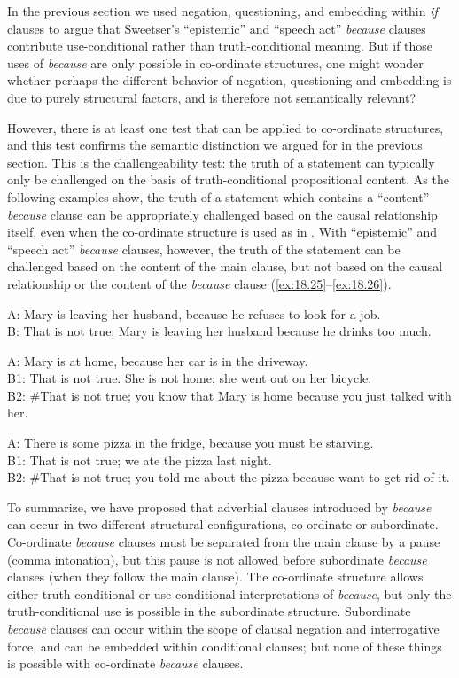 In the previous section we used negation, questioning, and embedding within \textit{if} clauses to argue that Sweetser’s “epistemic” and “speech act” \textit{because} clauses contribute use-conditional rather than truth-conditional meaning. But if those uses of \textit{because} are only possible in co-ordinate structures, one might wonder whether perhaps the different behavior of negation, questioning and embedding is due to purely structural factors, and is therefore not semantically relevant?



However, there is at least one test that can be applied to co-ordinate structures, and this test confirms the semantic distinction we argued for in the previous section. This is the challengeability test: the truth of a statement can typically only be challenged on the basis of truth-conditional propositional content. As the following examples show, the truth of a statement which contains a “content” \textit{because} clause can be appropriately challenged based on the causal relationship itself, even when the co-ordinate structure is used as in . With “epistemic” and “speech act” \textit{because} clauses, however, the truth of the statement can be challenged based on the content of the main clause, but not based on the causal relationship or the content of the \textit{because} clause (\ref{ex:18.25}--\ref{ex:18.26}).


\ea \label{ex:18.24}
A: Mary is leaving her husband, because he refuses to look for a job.\\
B: That is not true; Mary is leaving her husband because he drinks too much.
\z

\ea \label{ex:18.25}
A: Mary is at home, because her car is in the driveway.\\
B1: That is not true. She is not home; she went out on her bicycle.\\
B2: \#That is not true; you know that Mary is home because you just talked with her.
\z

\ea \label{ex:18.26}
A: There is some pizza in the fridge, because you must be starving.\\
B1: That is not true; we ate the pizza last night.\\
B2: \#That is not true; you told me about the pizza because want to get rid of it.
\z


To summarize, we have proposed that adverbial clauses introduced by \textit{because} can occur in two different structural configurations, co-ordinate or subordinate. Co-ordinate \textit{because} clauses must be separated from the main clause by a pause (comma intonation), but this pause is not allowed before subordinate \textit{because} clauses (when they follow the main clause). The co-ordinate structure allows either truth-conditional or use-conditional interpretations of \textit{because}, but only the truth-conditional use is possible in the subordinate structure. Subordinate \textit{because} clauses can occur within the scope of clausal negation and interrogative force, and can be embedded within conditional clauses; but none of these things is possible with co-ordinate \textit{because} clauses.


